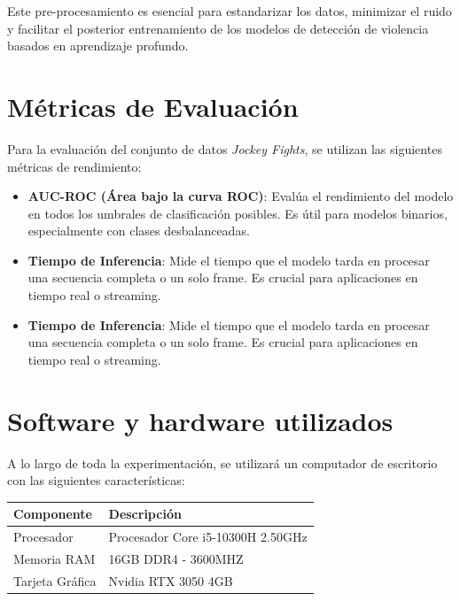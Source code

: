 Este pre-procesamiento es esencial para estandarizar 
los datos, minimizar el ruido y facilitar el posterior 
entrenamiento de los modelos de detección de violencia basados 
en aprendizaje profundo.

\section{Métricas de Evaluación}

Para la evaluación del conjunto de datos 
\textit{Jockey Fights}, se utilizan las siguientes 
métricas de rendimiento:

\begin{itemize}

    \item \textbf{AUC-ROC (Área bajo la curva ROC)}: Evalúa 
    el rendimiento del modelo en todos los umbrales de 
    clasificación posibles. Es útil para modelos binarios, 
    especialmente con clases desbalanceadas.
    
    \item \textbf{Tiempo de Inferencia}: Mide el tiempo que 
    el modelo tarda en procesar una secuencia completa o un 
    solo frame. Es crucial para aplicaciones en tiempo real 
    o streaming.

    \item \textbf{Tiempo de Inferencia}: Mide el tiempo que 
    el modelo tarda en procesar una secuencia completa o un solo frame. Es crucial para aplicaciones en tiempo real o streaming.
\end{itemize}

\section{Software y hardware utilizados}
A lo largo de toda la experimentación, se utilizará un computador de escritorio con las siguientes características:

\begin{table}[h!]
\centering
\footnotesize
\begin{tabular}{|l|l|}
\hline
\textbf{Componente} & \textbf{Descripción} \\ \hline
Procesador & Procesador	Core i5-10300H 2.50GHz\\ \hline
Memoria RAM & 16GB DDR4 - 3600MHZ \\ \hline
Tarjeta Gráfica & Nvidia RTX 3050 4GB \\ \hline
\end{tabular}
\end{table}

